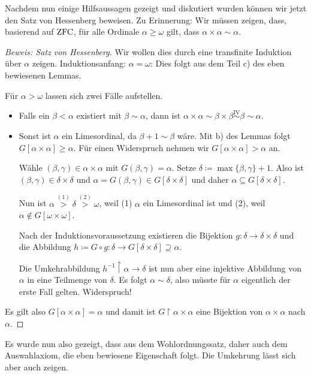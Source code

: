 Nachdem nun einige Hilfsaussagen gezeigt und diskutiert wurden können wir jetzt den Satz von Hessenberg beweisen. Zu Erinnerung: Wir müssen zeigen, dass, basierend auf $\operatorname{ZFC}$, für alle Ordinale $\alpha\geq\omega$ gilt, dass $\alpha\times\alpha\sim\alpha$.
\begin{proof}[Beweis: Satz von Hessenberg]
	Wir wollen dies durch eine transfinite Induktion über $\alpha$ zeigen.
	Induktionsanfang: $\alpha=\omega$: Dies folgt aus dem Teil c) des eben bewiesenen Lemmas.
	
	Für $\alpha>\omega$ lassen sich zwei Fälle aufstellen.
	\begin{itemize}
		\item Falls ein $\beta<\alpha$ existiert mit $\beta\sim\alpha$, dann ist $\alpha\times\alpha\sim\beta\times\beta \stackrel{\text{IV}}{\sim} \beta \sim \alpha$.
		\item Sonst ist $\alpha$ ein Limesordinal, da $\beta+1\sim\beta$ wäre. Mit b) des Lemmas folgt $G[\alpha\times\alpha]\geq\alpha$. Für einen Widerspruch nehmen wir $G[\alpha\times\alpha]>\alpha$ an.
		
		Wähle $(\beta,\gamma)\in\alpha\times\alpha$ mit $G(\beta,\gamma)=\alpha$. Setze $\delta\coloneqq\max\{\beta,\gamma\}+1$. Also ist $(\beta,\gamma)\in\delta\times\delta$ und $\alpha=G(\beta,\gamma)\in G[\delta\times\delta]$ und daher $\alpha\subseteq G[\delta\times\delta]$.
		
		Nun ist $\alpha\stackrel{(1)}{>}\delta\stackrel{(2)}{>}\omega$, weil (1) $\alpha$ ein Limesordinal ist und (2), weil $\alpha\notin G[\omega\times\omega]$.
		
		Nach der Induktionsvoraussetzung existieren die Bijektion $g:\delta\to\delta\times\delta$ und die Abbildung $h\coloneqq G\circ g : \delta\to G[\delta\times\delta]\supseteq\alpha$.
		
		Die Umkehrabbildung $h^{-1}\upharpoonright\alpha\to\delta$ ist nun aber eine injektive Abbildung von $\alpha$ in eine Teilmenge von $\delta$. Es folgt $\alpha\sim\delta$, also müsste für $\alpha$ eigentlich der erste Fall gelten. Widerspruch!
	\end{itemize}
	
	Es gilt also $G[\alpha\times\alpha]=\alpha$ und damit ist $G\upharpoonright\alpha\times\alpha$ eine Bijektion von $\alpha\times\alpha$ nach $\alpha$.
\end{proof}

Es wurde nun also gezeigt, dass aus dem Wohlordnungssatz, daher auch dem Auswahlaxiom, die eben bewiesene Eigenschaft folgt. Die Umkehrung lässt sich aber auch zeigen.

